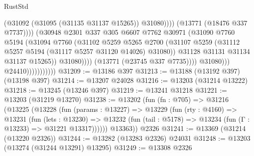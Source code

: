 \begin{lexlean}{RustStd}
\begin{coremodule}
                                                  (@31092 (@31095 (@31135 @31137 @15265)) @31080))))
                                            (@13771 (@18476 @337 @7737))))
                                        (@30948
                                          @2301
                                          @337
                                          @305
                                          @6607
                                          @7762
                                          @30971
                                          (@31090
                                            @7760
                                            @5194
                                            (@31094
                                              @7760
                                              (@31102
                                                @5259
                                                @5265
                                                @2700
                                                (@31107
                                                  @5259
                                                  (@31112
                                                    @5257
                                                    @5194
                                                    (@31117 @5257 @31120 @14026)
                                                    @31080))
                                                @31128
                                                @31131
                                                @31134
                                                @31137
                                                @15265))
                                            @31080))))
                                    (@13771 (@23745 @337 @7735))))
                                @31080)))
                          @24410)))))))))))
@31209 := @13186 @397
@31213 := @13188 (@13192 @397) (@13198 @397)
@31214 := @13207 @24028
@31216 := @13203 (@31214 @13222)
@31218 := @13245 (@13246 @397)
@31219 := @13241 @31218
@31221 := @13203 (@31219 @13270)
@31238 := @13202
    (fun (fn : @705) =>
    @31216
      (@13225
        (@13228
          (fun (params : @13227) =>
          @13229
            (fun (rty : @4160) =>
            @13231
              (fun (lets : @13230) =>
              @13232 (fun (tail : @5178) => @13234 (fun (Γ : @13233) => @31221 @13317))))))
        @13363))
    @2326
@31241 := @13369 (@31214 (@13220 @2326))
@31244 := @13282 (@13283 @2326) @24031
@31248 := @13203 (@13274 (@31244 @13291) @13295)
@31249 := @13308 @2326

\end{coremodule}
\end{lexlean}
